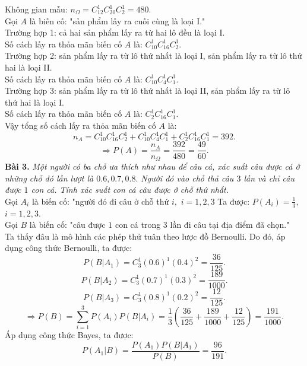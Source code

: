 \documentclass[12pt,a4paper]{article}
\begin{document}
Không gian mẫu: ${n_\Omega } = C_{12}^1C_{20}^1C_2^1 = 480.$\\
Gọi $A$ là biến cố: "sản phẩm lấy ra cuối cùng là loại I."\\
Trường hợp 1: cả hai sản phẩm lấy ra từ hai lô đều là loại I.\\
Số cách lấy ra thỏa mãn biến cố $A$ là: $C^1_{10} C^1_{16} C^1_{2}.$\\
Trường hợp 2: sản phẩm lấy ra từ lô thứ nhất là loại I, sản phẩm lấy ra từ lô thứ hai là loại II.\\
Số cách lấy ra thỏa mãn biến cố $A$ là: $C^1_{10} C^1_{4} C^1_{1}.$\\
Trường hợp 3: sản phẩm lấy ra từ lô thứ nhất là loại II, sản phẩm lấy ra từ lô thứ hai là loại I.\\
Số cách lấy ra thỏa mãn biến cố $A$ là: $C^1_2 C^1_{16} C^1_1.$\\
Vậy tổng số cách lấy ra thỏa mãn biến cố $A$ là: 
$${n_A} = C_{10}^1C_{16}^1C_2^1 + C_{10}^1C_4^1C_1^1 + C_2^1C_{16}^1C_1^1 = 392.$$
$$ \Rightarrow P\left( A \right) = \frac{{{n_A}}}{{{n_\Omega }}} = \frac{{392}}{{480}} = \frac{{49}}{{60}}.$$
\textbf{Bài 3.} \textit{Một người có ba chỗ ưa thích như nhau để câu cá, xác suất câu được cá ở những chỗ đó lần lượt là $0.6, 0.7, 0.8.$ Người đó vào chỗ thả câu $3$ lần và chỉ câu được $1$ con cá. Tính xác suất con cá câu được ở chỗ thứ nhất.}\\
Gọi $A_i$ là biến cố: "người đó đi câu ở chỗ thứ $i,$ $i = 1, 2, 3$ Ta được: $P \left( {A_i} \right) = \frac{1}{3},$ $i = 1, 2, 3.$\\
Gọi $B$ là biến cố: "câu được $1$ con cá trong $3$ lần đi câu tại địa điểm đã chọn."\\
Ta thấy đâu là mô hình các phép thử tuân theo lược đồ Bernoulli. Do đó, áp dụng công thức Bernoulli, ta được:
$$P\left( {\left. B \right|{A_1}} \right) = C_3^1{\left( {0.6} \right)^1}{\left( {0.4} \right)^2} = \frac{{36}}{{125}}.$$
$$P\left( {\left. B \right|{A_2}} \right) = C_3^1{\left( {0.7} \right)^1}{\left( {0.3} \right)^2} = \frac{{189}}{{1000}}.$$
$$P\left( {\left. B \right|{A_3}} \right) = C_3^1{\left( {0.8} \right)^1}{\left( {0.2} \right)^2} = \frac{{12}}{{125}}.$$
$$ \Rightarrow P\left( B \right) = \sum\limits_{i = 1}^3 {P\left( {{A_i}} \right)} P\left( {\left. B \right|{A_i}} \right) = \frac{1}{3}\left( {\frac{{36}}{{125}} + \frac{{189}}{{1000}} + \frac{{12}}{{125}}} \right) = \frac{{191}}{{1000}}.$$
Áp dụng công thức Bayes, ta được:
$$P\left( {\left. {{A_1}} \right|B} \right) = \frac{{P\left( {{A_1}} \right)P\left( {\left. B \right|{A_1}} \right)}}{{P\left( B \right)}} = \frac{{96}}{{191}}.$$
\end{document}
